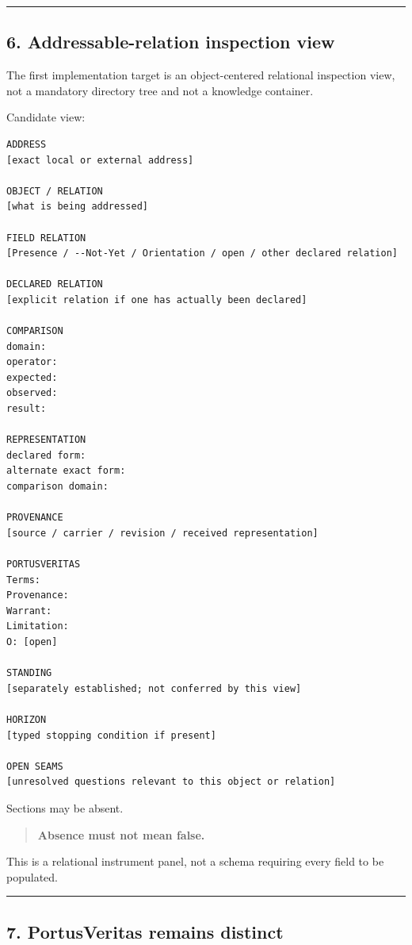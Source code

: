 \begin{center}\rule{0.5\linewidth}{0.5pt}\end{center}

\subsection{6. Addressable-relation inspection
view}\label{addressable-relation-inspection-view}

The first implementation target is an object-centered relational
inspection view, not a mandatory directory tree and not a knowledge
container.

Candidate view:

\begin{verbatim}
ADDRESS
[exact local or external address]

OBJECT / RELATION
[what is being addressed]

FIELD RELATION
[Presence / --Not-Yet / Orientation / open / other declared relation]

DECLARED RELATION
[explicit relation if one has actually been declared]

COMPARISON
domain:
operator:
expected:
observed:
result:

REPRESENTATION
declared form:
alternate exact form:
comparison domain:

PROVENANCE
[source / carrier / revision / received representation]

PORTUSVERITAS
Terms:
Provenance:
Warrant:
Limitation:
O: [open]

STANDING
[separately established; not conferred by this view]

HORIZON
[typed stopping condition if present]

OPEN SEAMS
[unresolved questions relevant to this object or relation]
\end{verbatim}

Sections may be absent.

\begin{quote}
\textbf{Absence must not mean false.}
\end{quote}

This is a relational instrument panel, not a schema requiring every
field to be populated.

\begin{center}\rule{0.5\linewidth}{0.5pt}\end{center}

\subsection{7. PortusVeritas remains
distinct}\label{portusveritas-remains-distinct}

